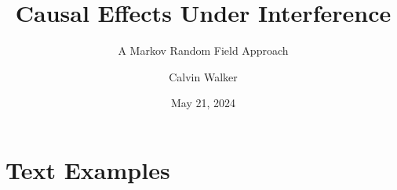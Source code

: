 \documentclass[
	11pt, %
]{beamer}
\title[Causal Effects]{Causal Effects Under Interference} %
\subtitle{A Markov Random Field Approach} %
\author[Calvin Walker]{Calvin Walker} %
\date[May 21, 2024]{May 21, 2024}%
\begin{document}

\begin{frame}
	\titlepage %
\end{frame}



	


\section{Text Examples} %
\end{document}
